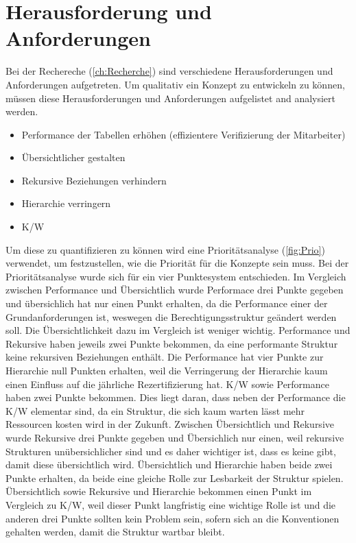 \section{Herausforderung und Anforderungen}
\label{sec:chapter04:Herausforderung}
Bei der Rechereche (\ref{ch:Recherche}) sind verschiedene Herausforderungen und Anforderungen aufgetreten.
Um qualitativ ein Konzept zu entwickeln zu können, müssen diese Herausforderungen und Anforderungen aufgelistet and analysiert werden.
\begin{itemize}
	\item Performance der Tabellen erhöhen (effizientere Verifizierung der Mitarbeiter)
	\item Übersichtlicher gestalten
	\item Rekursive Beziehungen verhindern
	\item Hierarchie verringern
	\item \ac{K/W}
\end{itemize}
Um diese zu quantifizieren zu können wird eine Prioritätsanalyse (\ref{fig:Prio}) verwendet, um festzustellen, wie die Priorität für die Konzepte sein muss. \cite{BdIufH}
Bei der Prioritätsanalyse wurde sich für ein vier Punktesystem entschieden.
\newline
Im Vergleich zwischen Performance und Übersichtlich wurde Performace drei Punkte gegeben und übersichlich hat nur einen Punkt erhalten, da die Performance einer der Grundanforderungen ist, weswegen die Berechtigungsstruktur geändert werden soll.
Die Übersichtlichkeit dazu im Vergleich ist weniger wichtig.
Performance und Rekursive haben jeweils zwei Punkte bekommen, da eine performante Struktur keine rekursiven Beziehungen enthält.
Die Performance hat vier Punkte zur Hierarchie null Punkten erhalten, weil die Verringerung der Hierarchie kaum einen Einfluss auf die jährliche Rezertifizierung hat.
\ac{K/W} sowie Performance haben zwei Punkte bekommen.
Dies liegt daran, dass neben der Performance die \ac{K/W} elementar sind, da ein Struktur, die sich kaum warten lässt mehr Ressourcen kosten wird in der Zukunft.
Zwischen Übersichtlich und Rekursive wurde Rekursive drei Punkte gegeben und Übersichlich nur einen, weil rekursive Strukturen unübersichlicher sind und es daher wichtiger ist, dass es keine gibt, damit diese übersichtlich wird.
Übersichtlich und Hierarchie haben beide zwei Punkte erhalten, da beide eine gleiche Rolle zur Lesbarkeit der Struktur spielen.
Übersichtlich sowie Rekursive und Hierarchie bekommen einen Punkt im Vergleich zu \ac{K/W}, weil dieser Punkt langfristig eine wichtige Rolle ist und die anderen drei Punkte sollten kein Problem sein, sofern sich an die Konventionen gehalten werden, damit die Struktur wartbar bleibt.
